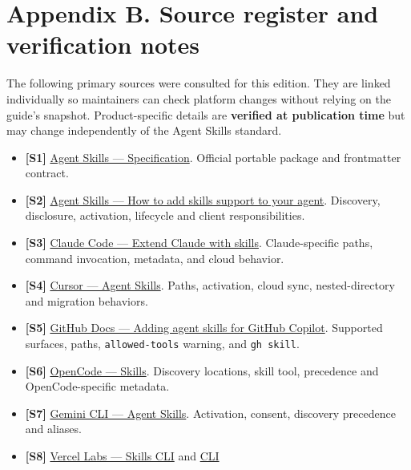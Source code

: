 \documentclass[
  10pt,
  letterpaper,
]{article}
\newcommand{\passthrough}[1]{#1}
\providecommand{\tightlist}{%
  \setlength{\itemsep}{0pt}\setlength{\parskip}{0pt}}
\begin{document}
\section{Appendix B. Source register and verification
notes}\label{appendix-b.-source-register-and-verification-notes}

The following primary sources were consulted for this edition. They are
linked individually so maintainers can check platform changes without
relying on the guide's snapshot. Product-specific details are
\textbf{verified at publication time} but may change independently of
the Agent Skills standard.

\begin{itemize}
\tightlist
\item
  \textbf{{[}S1{]}} \href{https://agentskills.io/specification}{Agent
  Skills --- Specification}. Official portable package and frontmatter
  contract.
\item
  \textbf{{[}S2{]}}
  \href{https://agentskills.io/client-implementation/adding-skills-support}{Agent
  Skills --- How to add skills support to your agent}. Discovery,
  disclosure, activation, lifecycle and client responsibilities.
\item
  \textbf{{[}S3{]}} \href{https://code.claude.com/docs/en/skills}{Claude
  Code --- Extend Claude with skills}. Claude-specific paths, command
  invocation, metadata, and cloud behavior.
\item
  \textbf{{[}S4{]}} \href{https://cursor.com/docs/skills}{Cursor ---
  Agent Skills}. Paths, activation, cloud sync, nested-directory and
  migration behaviors.
\item
  \textbf{{[}S5{]}}
  \href{https://docs.github.com/en/copilot/how-tos/copilot-on-github/customize-copilot/customize-cloud-agent/add-skills}{GitHub
  Docs --- Adding agent skills for GitHub Copilot}. Supported surfaces,
  paths, \passthrough{\lstinline!allowed-tools!} warning, and
  \passthrough{\lstinline!gh skill!}.
\item
  \textbf{{[}S6{]}} \href{https://opencode.ai/docs/skills/}{OpenCode ---
  Skills}. Discovery locations, skill tool, precedence and
  OpenCode-specific metadata.
\item
  \textbf{{[}S7{]}} \href{https://geminicli.com/docs/cli/skills/}{Gemini
  CLI --- Agent Skills}. Activation, consent, discovery precedence and
  aliases.
\item
  \textbf{{[}S8{]}} \href{https://github.com/vercel-labs/skills}{Vercel
  Labs --- Skills CLI} and
  \href{https://github.com/vercel-labs/skills/blob/main/docs/commands.md}{CLI
}
\end{itemize}
\end{document}
